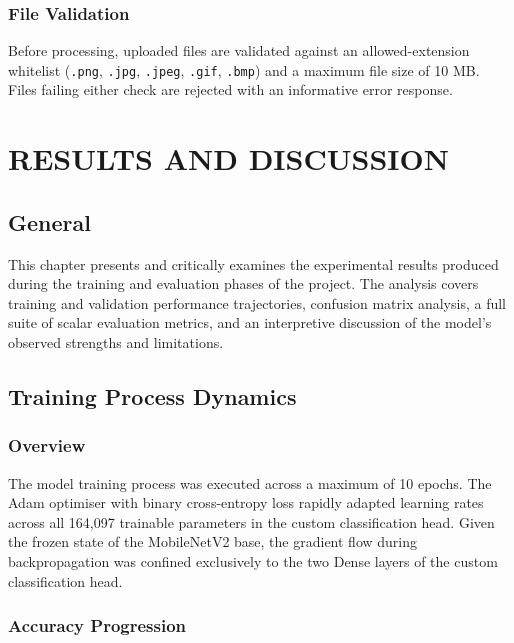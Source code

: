 \documentclass[12pt,a4paper]{report}
\begin{document}
\subsection{File Validation}

Before processing, uploaded files are validated against an allowed-extension whitelist (\texttt{.png}, \texttt{.jpg}, \texttt{.jpeg}, \texttt{.gif}, \texttt{.bmp}) and a maximum file size of 10 MB. Files failing either check are rejected with an informative error response.

\chapter{RESULTS AND DISCUSSION}

\section{General}

This chapter presents and critically examines the experimental results produced during the training and evaluation phases of the project. The analysis covers training and validation performance trajectories, confusion matrix analysis, a full suite of scalar evaluation metrics, and an interpretive discussion of the model's observed strengths and limitations.

\section{Training Process Dynamics}

\subsection{Overview}

The model training process was executed across a maximum of 10 epochs. The Adam optimiser with binary cross-entropy loss rapidly adapted learning rates across all 164,097 trainable parameters in the custom classification head. Given the frozen state of the MobileNetV2 base, the gradient flow during backpropagation was confined exclusively to the two Dense layers of the custom classification head.

\subsection{Accuracy Progression}
\end{document}
